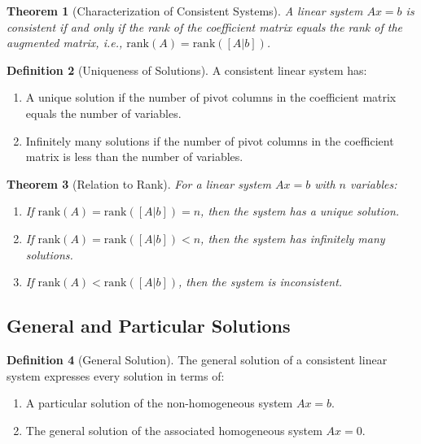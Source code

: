 \documentclass[12pt,a4paper]{article}
\theoremstyle{plain}
\newtheorem{theorem}{Theorem}[section]
\theoremstyle{definition}
\newtheorem{definition}[theorem]{Definition}
\begin{document}
\begin{theorem}[Characterization of Consistent Systems]
A linear system $Ax = b$ is consistent if and only if the rank of the coefficient matrix equals the rank of the augmented matrix, i.e., $\text{rank}(A) = \text{rank}([A|b])$.
\end{theorem}

\begin{definition}[Uniqueness of Solutions]
A consistent linear system has:
\begin{enumerate}[label=(\roman*)]
\item A unique solution if the number of pivot columns in the coefficient matrix equals the number of variables.
\item Infinitely many solutions if the number of pivot columns in the coefficient matrix is less than the number of variables.
\end{enumerate}
\end{definition}

\begin{theorem}[Relation to Rank]
For a linear system $Ax = b$ with $n$ variables:
\begin{enumerate}[label=(\roman*)]
\item If $\text{rank}(A) = \text{rank}([A|b]) = n$, then the system has a unique solution.
\item If $\text{rank}(A) = \text{rank}([A|b]) < n$, then the system has infinitely many solutions.
\item If $\text{rank}(A) < \text{rank}([A|b])$, then the system is inconsistent.
\end{enumerate}
\end{theorem}

\subsection{General and Particular Solutions}

\begin{definition}[General Solution]
The general solution of a consistent linear system expresses every solution in terms of:
\begin{enumerate}[label=(\roman*)]
\item A particular solution of the non-homogeneous system $Ax = b$.
\item The general solution of the associated homogeneous system $Ax = 0$.
\end{enumerate}
\end{definition}
\end{document}
